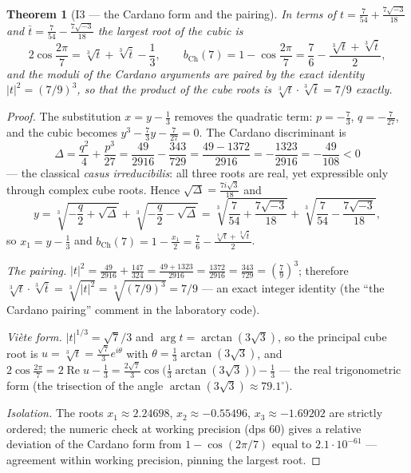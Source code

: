 \documentclass[11pt,a4paper]{article}
\theoremstyle{plain}
\newtheorem{theorem}{Theorem}
\theoremstyle{definition}
\theoremstyle{remark}
\newcommand{\re}{\operatorname{Re}}
\begin{document}
\begin{theorem}[I3 --- the Cardano form and the pairing]\label{th:I3}
In terms of $t=\frac{7}{54}+\frac{7\sqrt{-3}}{18}$ and
$\bar t=\frac{7}{54}-\frac{7\sqrt{-3}}{18}$ the largest root of
the cubic is
\[
  2\cos\frac{2\pi}{7}=\sqrt[3]{t}+\sqrt[3]{\bar t}-\frac13,
  \qquad
  b_{\mathrm{Ch}}(7)=1-\cos\frac{2\pi}{7}
  =\frac76-\frac{\sqrt[3]{t}+\sqrt[3]{\bar t}}{2},
\]
and the moduli of the Cardano arguments are paired by the exact
identity $|t|^2=(7/9)^3$, so that the product of the cube roots
is $\sqrt[3]{t}\cdot\sqrt[3]{\bar t}=7/9$ exactly.
\end{theorem}

\begin{proof}
The substitution $x=y-\frac13$ removes the quadratic term:
$p=-\frac73$, $q=-\frac{7}{27}$, and the cubic becomes
$y^3-\frac73y-\frac7{27}=0$. The Cardano discriminant is
\[
  \Delta=\frac{q^2}{4}+\frac{p^3}{27}
  =\frac{49}{2916}-\frac{343}{729}
  =\frac{49-1372}{2916}=-\frac{1323}{2916}=-\frac{49}{108}<0
\]
--- the classical \emph{casus irreducibilis}: all three roots are
real, yet expressible only through complex cube roots. Hence
$\sqrt{\Delta}=\frac{7i\sqrt3}{18}$ and
\[
  y=\sqrt[3]{-\frac q2+\sqrt\Delta}+\sqrt[3]{-\frac q2-\sqrt\Delta}
  =\sqrt[3]{\frac{7}{54}+\frac{7\sqrt{-3}}{18}}
  +\sqrt[3]{\frac{7}{54}-\frac{7\sqrt{-3}}{18}},
\]
so $x_1=y-\frac13$ and $b_{\mathrm{Ch}}(7)=1-\frac{x_1}{2}
=\frac76-\frac{\sqrt[3]{t}+\sqrt[3]{\bar t}}{2}$.

\emph{The pairing.} $|t|^2=\frac{49}{2916}+\frac{147}{324}
=\frac{49+1323}{2916}=\frac{1372}{2916}=\frac{343}{729}=\left(\frac79\right)^3$;
therefore $\sqrt[3]{t}\cdot\sqrt[3]{\bar t}=\sqrt[3]{|t|^2}
=\sqrt[3]{(7/9)^3}=7/9$ --- an exact integer identity (the
``the Cardano pairing'' comment in the laboratory code).

\emph{Vi\`ete form.} $|t|^{1/3}=\sqrt{7}/3$ and
$\arg t=\arctan(3\sqrt3)$, so the principal cube root is
$u=\sqrt[3]{t}=\frac{\sqrt7}{3}e^{i\theta}$ with
$\theta=\frac13\arctan(3\sqrt3)$, and
$2\cos\frac{2\pi}{7}=2\re u-\frac13
=\frac{2\sqrt7}{3}\cos\!\Big(\frac13\arctan(3\sqrt3)\Big)-\frac13$
--- the real trigonometric form (the trisection of the angle
$\arctan(3\sqrt3)\approx79.1^\circ$).

\emph{Isolation.} The roots $x_1\approx2.24698$,
$x_2\approx-0.55496$, $x_3\approx-1.69202$ are strictly ordered;
the numeric check at working precision (dps 60) gives a relative
deviation of the Cardano form from $1-\cos(2\pi/7)$ equal to
$2.1\cdot10^{-61}$ --- agreement within working precision,
pinning the largest root.
\end{proof}
\end{document}
